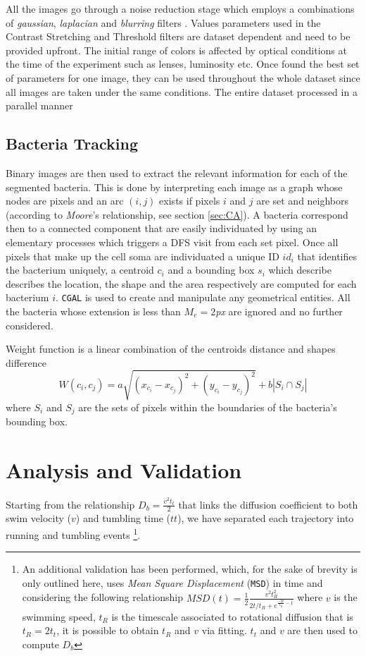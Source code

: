 \documentclass[conference]{IEEEtran}
\begin{document}
All the images go through a noise reduction stage which employs a combinations of \textit{gaussian}, \textit{laplacian} and \textit{blurring} filters \cite{Deng:1993}.
Values parameters used in the Contrast Stretching and Threshold filters are dataset dependent and need to be provided upfront. The initial range of colors is affected by optical conditions at the time of the experiment such as lenses, luminosity etc. Once found the best set of parameters for one image, they can be used throughout the whole dataset since all images are taken under the same conditions.
The entire dataset processed in a parallel manner 

\subsection{Bacteria Tracking}

Binary images are then used to extract the relevant information for each of the segmented bacteria. This is done by interpreting each image as a graph whose nodes are pixels and an arc $(i,j)$ exists if pixels $i$ and $j$ are set and neighbors (according to \textit{Moore}'s relationship, see section \ref{sec:CA}). A bacteria correspond then to a connected component that are easily individuated by using an elementary processes which triggers a DFS visit from each set pixel. Once all pixels that make up the cell soma are individuated a unique ID $id_i$ that  identifies the bacterium uniquely, a centroid $c_i$ and a bounding box $s_i$ which describe describes the location, the shape and the area respectively are computed for each bacterium $i$. \texttt{CGAL} \cite{CGAL} is used to create and manipulate any geometrical entities. All the bacteria whose extension is less than $M_e = 2$\textit{px} are ignored and no further considered.

Weight function is a linear combination of the centroids distance and shapes difference 
\begin{equation}
\label{sec:bacttracking}
W(c_i,c_j) = a \sqrt{(x_{c_i} - x_{c_j})^2 + (y_{c_i}-y_{c_j})^2} + b |S_i \cap S_j|
\end{equation}
where $S_i$ and $S_j$ are the sets of pixels within the boundaries of the bacteria's  bounding box.






\section{Analysis and Validation}
Starting from the relationship $D_b=  \frac{v^2 t_t}{2}$  \cite{Berg:1993} that links the diffusion coefficient to both swim velocity ($v$) and tumbling time ($tt$), 
we have separated each trajectory into running and tumbling events \footnote{An additional validation has been performed, which, for the sake of brevity is only outlined here, uses \textit{Mean Square Displacement} (\texttt{MSD}) in time and considering the following relationship $MSD(t)=\frac{1}{2}\frac{v^2 t_R^2}{2t/t_R +e^{\frac{-2t}{t_R}-1}}$ \cite{Howse:2007} where $v$ is the swimming speed, $t_R$ is the timescale associated to rotational diffusion that is $t_R=2t_t$, it is possible to obtain $t_R $ and $v$ via fitting. $t_t$ and $v$ are then used to compute $D_b$}. 
\end{document}
